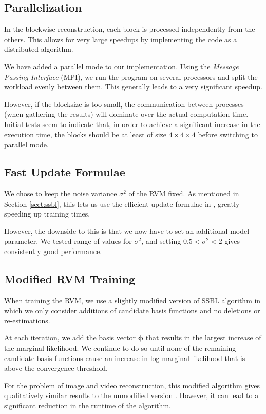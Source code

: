 \subsection{Parallelization}
In the blockwise reconstruction, each block is processed independently from the others.
This allows for very large speedups by implementing the code as a distributed algorithm.

We have added a parallel mode to our implementation.
Using the \emph{Message Passing Interface} (MPI), we run the program on several processors and split the workload evenly between them.
This generally leads to a very significant speedup.

However, if the blocksize is too small, the communication between processes (when gathering the results) will dominate over the actual computation time.
Initial tests seem to indicate that, in order to achieve a significant increase in the execution time, the blocks should be at least of size $4\times4\times4$ before switching to parallel mode.


\subsection{Fast Update Formulae}
We chose to keep the noise variance $\sigma^2$ of the RVM fixed.
As mentioned in Section \ref{sect:ssbl}, this lets us use the efficient update formulae in \cite{tipping2003}, greatly speeding up training times.

However, the downside to this is that we now have to set an additional model parameter.
We tested range of values for $\sigma^2$, and setting $0.5 < \sigma^2 < 2$ gives consistently good performance.

\subsection{Modified RVM Training}
When training the RVM, we use a slightly modified version of SSBL algorithm in which we only consider additions of candidate basis functions and no deletions or re-estimations.

At each iteration, we add the basis vector $\bm\phi$ that results in the largest increase of the marginal likelihood.
We continue to do so until none of the remaining candidate basis functions cause an increase in log marginal likelihood that is above the convergence threshold.

For the problem of image and video reconstruction, this modified algorithm gives qualitatively similar results to the unmodified version \cite{pilikos2014}. However, it can lead to a significant reduction in the runtime of the algorithm.
